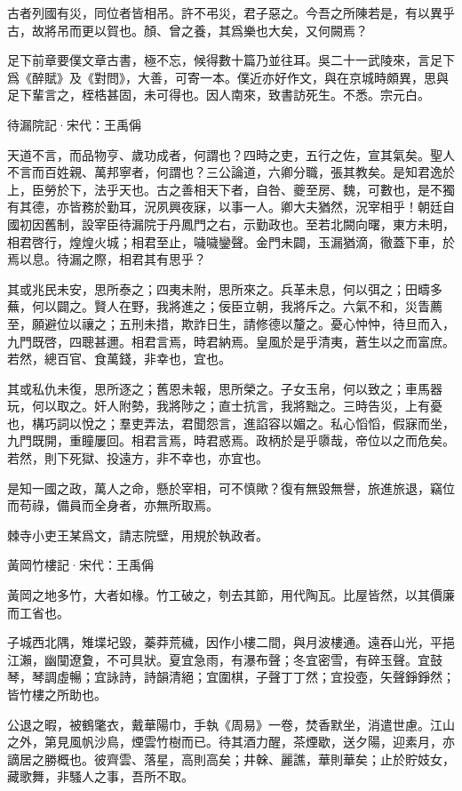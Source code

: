 \documentclass[12pt,a4paper]{ctexbook}
\begin{document}
古者列國有災，同位者皆相吊。許不弔災，君子惡之。今吾之所陳若是，有以異乎古，故將吊而更以賀也。顏、曾之養，其爲樂也大矣，又何闕焉？\par
足下前章要僕文章古書，極不忘，候得數十篇乃並往耳。吳二十一武陵來，言足下爲《醉賦》及《對問》，大善，可寄一本。僕近亦好作文，與在京城時頗異，思與足下輩言之，桎梏甚固，未可得也。因人南來，致書訪死生。不悉。宗元白。\par
待漏院記·宋代：王禹偁 \par
天道不言，而品物亨、歲功成者，何謂也？四時之吏，五行之佐，宣其氣矣。聖人不言而百姓親、萬邦寧者，何謂也？三公論道，六卿分職，張其教矣。是知君逸於上，臣勞於下，法乎天也。古之善相天下者，自咎、夔至房、魏，可數也，是不獨有其德，亦皆務於勤耳，況夙興夜寐，以事一人。卿大夫猶然，況宰相乎！朝廷自國初因舊制，設宰臣待漏院于丹鳳門之右，示勤政也。至若北闕向曙，東方未明，相君啓行，煌煌火城；相君至止，噦噦鑾聲。金門未闢，玉漏猶滴，徹蓋下車，於焉以息。待漏之際，相君其有思乎？\par
其或兆民未安，思所泰之；四夷未附，思所來之。兵革未息，何以弭之；田疇多蕪，何以闢之。賢人在野，我將進之；佞臣立朝，我將斥之。六氣不和，災眚薦至，願避位以禳之；五刑未措，欺詐日生，請修德以釐之。憂心忡忡，待旦而入，九門既啓，四聰甚邇。相君言焉，時君納焉。皇風於是乎清夷，蒼生以之而富庶。若然，總百官、食萬錢，非幸也，宜也。\par
其或私仇未復，思所逐之；舊恩未報，思所榮之。子女玉帛，何以致之；車馬器玩，何以取之。奸人附勢，我將陟之；直士抗言，我將黜之。三時告災，上有憂也，構巧詞以悅之；羣吏弄法，君聞怨言，進諂容以媚之。私心慆慆，假寐而坐，九門既開，重瞳屢回。相君言焉，時君惑焉。政柄於是乎隳哉，帝位以之而危矣。若然，則下死獄、投遠方，非不幸也，亦宜也。\par
是知一國之政，萬人之命，懸於宰相，可不慎歟？復有無毀無譽，旅進旅退，竊位而苟祿，備員而全身者，亦無所取焉。\par
棘寺小吏王某爲文，請志院壁，用規於執政者。\par
黃岡竹樓記·宋代：王禹偁 \par
黃岡之地多竹，大者如椽。竹工破之，刳去其節，用代陶瓦。比屋皆然，以其價廉而工省也。\par
子城西北隅，雉堞圮毀，蓁莽荒穢，因作小樓二間，與月波樓通。遠吞山光，平挹江瀨，幽闃遼夐，不可具狀。夏宜急雨，有瀑布聲；冬宜密雪，有碎玉聲。宜鼓琴，琴調虛暢；宜詠詩，詩韻清絕；宜圍棋，子聲丁丁然；宜投壺，矢聲錚錚然；皆竹樓之所助也。\par
公退之暇，被鶴氅衣，戴華陽巾，手執《周易》一卷，焚香默坐，消遣世慮。江山之外，第見風帆沙鳥，煙雲竹樹而已。待其酒力醒，茶煙歇，送夕陽，迎素月，亦謫居之勝概也。彼齊雲、落星，高則高矣；井榦、麗譙，華則華矣；止於貯妓女，藏歌舞，非騷人之事，吾所不取。\par
\end{document}
